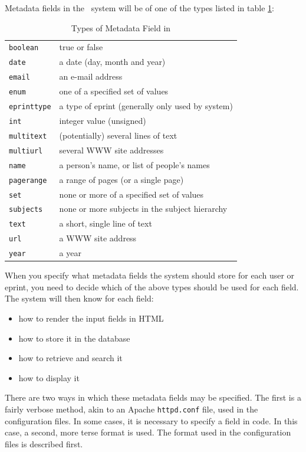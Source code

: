 Metadata fields in the \eprints\ system will be of one of the types listed in table \ref{table_metadata_types}:

\begin{table}
\begin{tabular}{|l|l|}
\hline
{\tt boolean}    & true or false \\
{\tt date}       & a date (day, month and year) \\
{\tt email}      & an e-mail address \\
{\tt enum}       & one of a specified set of values \\
{\tt eprinttype} & a type of eprint (generally only used by system) \\
{\tt int}        & integer value (unsigned) \\
{\tt multitext}  & (potentially) several lines of text \\
{\tt multiurl}   & several WWW site addresses \\
{\tt name}       & a person's name, or list of people's names \\
{\tt pagerange}  & a range of pages (or a single page) \\
{\tt set}        & none or more of a specified set of values \\
{\tt subjects}   & none or more subjects in the subject hierarchy \\
{\tt text}       & a short, single line of text \\
{\tt url}        & a WWW site address \\
{\tt year}       & a year \\
\hline
\end{tabular}
\caption{\label{table_metadata_types} Types of Metadata Field in \eprints}
\end{table}

When you specify what metadata fields the system should store for each user or eprint, you need to decide which of the above types should be used for each field. The system will then know for each field:

\begin{itemize}
\item how to render the input fields in HTML
\item how to store it in the database
\item how to retrieve and search it
\item how to display it
\end{itemize}

There are two ways in which these metadata fields may be specified. The first is a fairly verbose method, akin to an Apache {\tt httpd.conf} file, used in the configuration files. In some cases, it is necessary to specify a field in code. In this case, a second, more terse format is used. The format used in the configuration files is described first.

